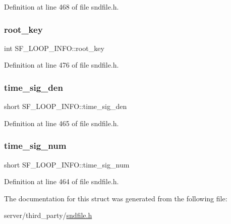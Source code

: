 Definition at line 468 of file sndfile.\+h.

\mbox{\label{struct_s_f___l_o_o_p___i_n_f_o_a2755451bf6c64d3c0f8202d7e427f6b8}} 
\subsubsection{\texorpdfstring{root\_key}{root\_key}}
{\footnotesize\ttfamily int S\+F\+\_\+\+L\+O\+O\+P\+\_\+\+I\+N\+F\+O\+::root\+\_\+key}



Definition at line 476 of file sndfile.\+h.

\mbox{\label{struct_s_f___l_o_o_p___i_n_f_o_a0a90aff8f6d4a38e70beea2ee589df8e}} 
\subsubsection{\texorpdfstring{time\_sig\_den}{time\_sig\_den}}
{\footnotesize\ttfamily short S\+F\+\_\+\+L\+O\+O\+P\+\_\+\+I\+N\+F\+O\+::time\+\_\+sig\+\_\+den}



Definition at line 465 of file sndfile.\+h.

\mbox{\label{struct_s_f___l_o_o_p___i_n_f_o_a6ece67f0077c22fadbc875e0250ad656}} 
\subsubsection{\texorpdfstring{time\_sig\_num}{time\_sig\_num}}
{\footnotesize\ttfamily short S\+F\+\_\+\+L\+O\+O\+P\+\_\+\+I\+N\+F\+O\+::time\+\_\+sig\+\_\+num}



Definition at line 464 of file sndfile.\+h.



The documentation for this struct was generated from the following file\+:\begin{DoxyCompactItemize}
\item 
server/third\+\_\+party/\mbox{\hyperlink{sndfile_8h}{sndfile.\+h}}\end{DoxyCompactItemize}
